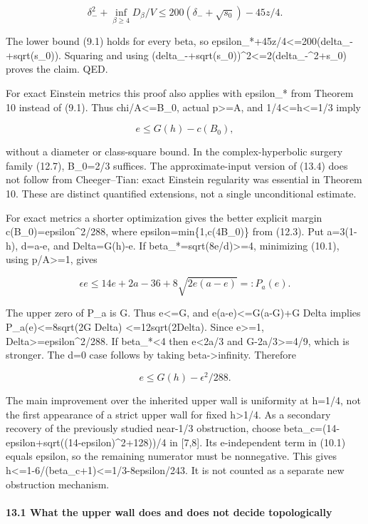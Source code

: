 \documentclass[
  10pt,
]{article}
\begin{document}
\[
 \delta_-^2+\inf_{\beta\ge4}D_\beta/V
        \le200(\delta_-+\sqrt{s_0})-45z/4.
\]

The lower bound (9.1) holds for every beta, so
epsilon\_*+45z/4\textless=200(delta\_-+sqrt(s\_0)). Squaring and using
(delta\_-+sqrt(s\_0))\^{}2\textless=2(delta\_-\^{}2+s\_0) proves the
claim. QED.

For exact Einstein metrics this proof also applies with epsilon\_* from
Theorem 10 instead of (9.1). Thus chi/A\textless=B\_0, actual
p\textgreater=A, and 1/4\textless=h\textless=1/3 imply

\[
                      e\le G(h)-c(B_0),                \tag{13.4}
\]

without a diameter or class-square bound. In the complex-hyperbolic
surgery family (12.7), B\_0=2/3 suffices. The approximate-input version
of (13.4) does not follow from Cheeger--Tian: exact Einstein regularity
was essential in Theorem 10. These are distinct quantified extensions,
not a single unconditional estimate.

For exact metrics a shorter optimization gives the better explicit
margin c(B\_0)=epsilon\^{}2/288, where epsilon=min\{1,c(4B\_0)\} from
(12.3). Put a=3(1-h), d=a-e, and Delta=G(h)-e. If
beta\_*=sqrt(8e/d)\textgreater=4, minimizing (10.1), using
p/A\textgreater=1, gives

\[
 \epsilon e\le 14e+2a-36+8\sqrt{2e(a-e)}=:P_a(e).
\]

The upper zero of P\_a is G. Thus e\textless=G, and
e(a-e)\textless=G(a-G)+G Delta implies P\_a(e)\textless=8sqrt(2G Delta)
\textless=12sqrt(2Delta). Since e\textgreater=1,
Delta\textgreater=epsilon\^{}2/288. If beta\_*\textless4 then
e\textless2a/3 and G-2a/3\textgreater=4/9, which is stronger. The d=0
case follows by taking beta-\textgreater infinity. Therefore

\[
                 e\le G(h)-\epsilon^2/288.             \tag{13.5}
\]

The main improvement over the inherited upper wall is uniformity at
h=1/4, not the first appearance of a strict upper wall for fixed
h\textgreater1/4. As a secondary recovery of the previously studied
near-1/3 obstruction, choose
beta\_c=(14-epsilon+sqrt((14-epsilon)\^{}2+128))/4 in {[}7,8{]}. Its
e-independent term in (10.1) equals epsilon, so the remaining numerator
must be nonnegative. This gives
h\textless=1-6/(beta\_c+1)\textless=1/3-8epsilon/243. It is not counted
as a separate new obstruction mechanism.

\hypertarget{what-the-upper-wall-does-and-does-not-decide-topologically}{%
\paragraph{13.1 What the upper wall does and does not decide
topologically}\label{what-the-upper-wall-does-and-does-not-decide-topologically}}
\end{document}
